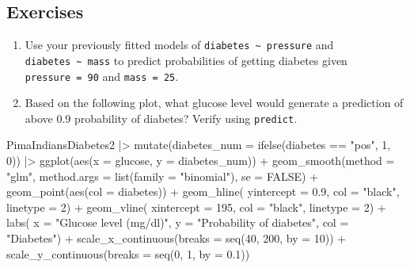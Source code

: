 \documentclass[
  letterpaper,
  DIV=11,
  numbers=noendperiod]{scrreprt}
\newenvironment{Shaded}{\begin{snugshade}}{\end{snugshade}}
\newcommand{\AttributeTok}[1]{\textcolor[rgb]{0.40,0.45,0.13}{#1}}
\newcommand{\ConstantTok}[1]{\textcolor[rgb]{0.56,0.35,0.01}{#1}}
\newcommand{\DecValTok}[1]{\textcolor[rgb]{0.68,0.00,0.00}{#1}}
\newcommand{\FloatTok}[1]{\textcolor[rgb]{0.68,0.00,0.00}{#1}}
\newcommand{\FunctionTok}[1]{\textcolor[rgb]{0.28,0.35,0.67}{#1}}
\newcommand{\NormalTok}[1]{\textcolor[rgb]{0.00,0.23,0.31}{#1}}
\newcommand{\SpecialCharTok}[1]{\textcolor[rgb]{0.37,0.37,0.37}{#1}}
\newcommand{\StringTok}[1]{\textcolor[rgb]{0.13,0.47,0.30}{#1}}
\providecommand{\tightlist}{%
  \setlength{\itemsep}{0pt}\setlength{\parskip}{0pt}}\usepackage{longtable,booktabs,array}
\begin{document}
\subsection{Exercises}\label{exercises-25}

\begin{enumerate}
\def\labelenumi{\arabic{enumi}.}
\tightlist
\item
  Use your previously fitted models of
  \texttt{diabetes\ \textasciitilde{}\ pressure} and
  \texttt{diabetes\ \textasciitilde{}\ mass} to predict probabilities of
  getting diabetes given \texttt{pressure\ =\ 90} and
  \texttt{mass\ =\ 25}.
\item
  Based on the following plot, what glucose level would generate a
  prediction of above 0.9 probability of diabetes? Verify using
  \texttt{predict}.
\end{enumerate}

\begin{Shaded}
\begin{Highlighting}[]
\NormalTok{PimaIndiansDiabetes2 }\SpecialCharTok{|\textgreater{}}
  \FunctionTok{mutate}\NormalTok{(}\AttributeTok{diabetes\_num =} \FunctionTok{ifelse}\NormalTok{(diabetes }\SpecialCharTok{==} \StringTok{"pos"}\NormalTok{, }\DecValTok{1}\NormalTok{, }\DecValTok{0}\NormalTok{)) }\SpecialCharTok{|\textgreater{}}
  \FunctionTok{ggplot}\NormalTok{(}\FunctionTok{aes}\NormalTok{(}\AttributeTok{x =}\NormalTok{ glucose, }\AttributeTok{y =}\NormalTok{ diabetes\_num)) }\SpecialCharTok{+}
  \FunctionTok{geom\_smooth}\NormalTok{(}\AttributeTok{method =} \StringTok{"glm"}\NormalTok{, }\AttributeTok{method.args =} \FunctionTok{list}\NormalTok{(}\AttributeTok{family =} \StringTok{"binomial"}\NormalTok{), }\AttributeTok{se =} \ConstantTok{FALSE}\NormalTok{) }\SpecialCharTok{+}
  \FunctionTok{geom\_point}\NormalTok{(}\FunctionTok{aes}\NormalTok{(}\AttributeTok{col =}\NormalTok{ diabetes)) }\SpecialCharTok{+}
  \FunctionTok{geom\_hline}\NormalTok{(}
    \AttributeTok{yintercept =} \FloatTok{0.9}\NormalTok{,}
    \AttributeTok{col =} \StringTok{"black"}\NormalTok{,}
    \AttributeTok{linetype =} \DecValTok{2}\NormalTok{) }\SpecialCharTok{+}
  \FunctionTok{geom\_vline}\NormalTok{(}
    \AttributeTok{xintercept =} \DecValTok{195}\NormalTok{,}
    \AttributeTok{col =} \StringTok{"black"}\NormalTok{,}
    \AttributeTok{linetype =} \DecValTok{2}\NormalTok{) }\SpecialCharTok{+}
  \FunctionTok{labs}\NormalTok{(}
   \AttributeTok{x =} \StringTok{"Glucose level (mg/dl)"}\NormalTok{,}
   \AttributeTok{y =} \StringTok{"Probability of diabetes"}\NormalTok{,}
   \AttributeTok{col =} \StringTok{"Diabetes"}\NormalTok{) }\SpecialCharTok{+}
  \FunctionTok{scale\_x\_continuous}\NormalTok{(}\AttributeTok{breaks =} \FunctionTok{seq}\NormalTok{(}\DecValTok{40}\NormalTok{, }\DecValTok{200}\NormalTok{, }\AttributeTok{by =} \DecValTok{10}\NormalTok{)) }\SpecialCharTok{+}
  \FunctionTok{scale\_y\_continuous}\NormalTok{(}\AttributeTok{breaks =} \FunctionTok{seq}\NormalTok{(}\DecValTok{0}\NormalTok{, }\DecValTok{1}\NormalTok{, }\AttributeTok{by =} \FloatTok{0.1}\NormalTok{))}
\end{Highlighting}
\end{Shaded}
\end{document}
